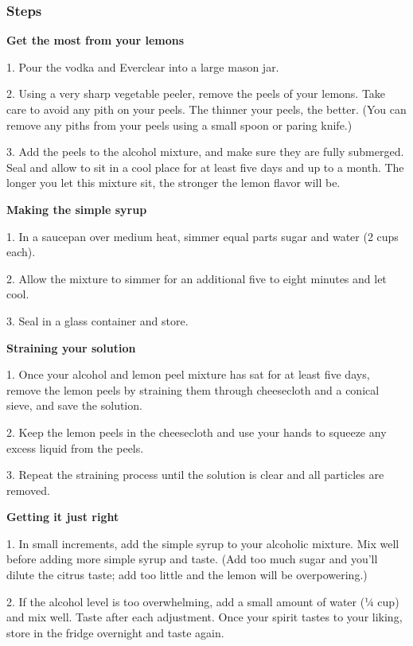 \hypertarget{steps}{%
\subsubsection{\texorpdfstring{\textbf{Steps}}{Steps}}\label{steps}}

\textbf{Get the most from your lemons}

1. Pour the vodka and Everclear into a large mason jar.

2. Using a very sharp vegetable peeler, remove the peels of your lemons.
Take care to avoid any pith on your peels. The thinner your peels, the
better. (You can remove any piths from your peels using a small spoon or
paring knife.)

3. Add the peels to the alcohol mixture, and make sure they are fully
submerged. Seal and allow to sit in a cool place for at least five days
and up to a month. The longer you let this mixture sit, the stronger the
lemon flavor will be.

\textbf{Making the simple syrup}

1. In a saucepan over medium heat, simmer equal parts sugar and water (2
cups each).

2. Allow the mixture to simmer for an additional five to eight minutes
and let cool.

3. Seal in a glass container and store.

\textbf{Straining your solution}

1. Once your alcohol and lemon peel mixture has sat for at least five
days, remove the lemon peels by straining them through cheesecloth and a
conical sieve, and save the solution.

2. Keep the lemon peels in the cheesecloth and use your hands to squeeze
any excess liquid from the peels.

3. Repeat the straining process until the solution is clear and all
particles are removed.

\textbf{Getting it just right}

1. In small increments, add the simple syrup to your alcoholic mixture.
Mix well before adding more simple syrup and taste. (Add too much sugar
and you'll dilute the citrus taste; add too little and the lemon will be
overpowering.)

2. If the alcohol level is too overwhelming, add a small amount of water
(¼ cup) and mix well. Taste after each adjustment. Once your spirit
tastes to your liking, store in the fridge overnight and taste again.

